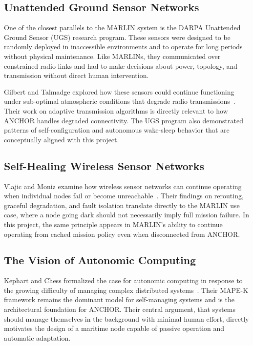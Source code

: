 \documentclass[journal]{IEEEtran}
\begin{document}
\subsection{Unattended Ground Sensor Networks}
One of the closest parallels to the MARLIN system is the DARPA Unattended Ground Sensor (UGS) research program. These sensors were designed to be randomly deployed in inaccessible environments and to operate for long periods without physical maintenance. Like MARLINs, they communicated over constrained radio links and had to make decisions about power, topology, and transmission without direct human intervention.

Gilbert and Talmadge explored how these sensors could continue functioning under sub-optimal atmospheric conditions that degrade radio transmissions~\cite{gilbert1997ugs}. Their work on adaptive transmission algorithms is directly relevant to how ANCHOR handles degraded connectivity. The UGS program also demonstrated patterns of self-configuration and autonomous wake-sleep behavior that are conceptually aligned with this project.

\subsection{Self-Healing Wireless Sensor Networks}
Vlajic and Moniz examine how wireless sensor networks can continue operating when individual nodes fail or become unreachable~\cite{vlajic2007selfhealing}. Their findings on rerouting, graceful degradation, and fault isolation translate directly to the MARLIN use case, where a node going dark should not necessarily imply full mission failure. In this project, the same principle appears in MARLIN's ability to continue operating from cached mission policy even when disconnected from ANCHOR.

\subsection{The Vision of Autonomic Computing}
Kephart and Chess formalized the case for autonomic computing in response to the growing difficulty of managing complex distributed systems~\cite{kephart2003vision}. Their MAPE-K framework remains the dominant model for self-managing systems and is the architectural foundation for ANCHOR. Their central argument, that systems should manage themselves in the background with minimal human effort, directly motivates the design of a maritime node capable of passive operation and automatic adaptation.
\end{document}
